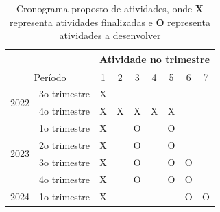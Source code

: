 \begin{table}[!h]
\centering
\label{table:cronogramaproposta}
\caption{Cronograma proposto de atividades, onde \textbf{X} representa atividades finalizadas e \textbf{O} representa atividades a desenvolver}
\label{tab:my-table}
\begin{tabular}{ccccccccc}
\cline{3-9}
 & \multicolumn{1}{c|}{} & \multicolumn{7}{c|}{Atividade no trimestre} \\ \hline
\multicolumn{2}{|c|}{Período} & \multicolumn{1}{c|}{1} & \multicolumn{1}{c|}{2} & \multicolumn{1}{c|}{3} & \multicolumn{1}{c|}{4} & \multicolumn{1}{c|}{5} & \multicolumn{1}{c|}{6} & \multicolumn{1}{c|}{7} \\ \hline
\multicolumn{1}{|c|}{\multirow{2}{*}{2022}} & \multicolumn{1}{c|}{3o trimestre} & \multicolumn{1}{c|}{X} & \multicolumn{1}{c|}{} & \multicolumn{1}{c|}{} & \multicolumn{1}{c|}{} & \multicolumn{1}{c|}{} & \multicolumn{1}{c|}{} & \multicolumn{1}{c|}{} \\ \cline{2-9} 
\multicolumn{1}{|c|}{} & \multicolumn{1}{c|}{4o trimestre} & \multicolumn{1}{c|}{X} & \multicolumn{1}{c|}{X} & \multicolumn{1}{c|}{X} & \multicolumn{1}{c|}{X} & \multicolumn{1}{c|}{X} & \multicolumn{1}{c|}{} & \multicolumn{1}{c|}{} \\ \hline
\multicolumn{1}{|c|}{\multirow{4}{*}{2023}} & \multicolumn{1}{c|}{1o trimestre} & \multicolumn{1}{c|}{X} & \multicolumn{1}{c|}{} & \multicolumn{1}{c|}{O} & \multicolumn{1}{c|}{} & \multicolumn{1}{c|}{O} & \multicolumn{1}{c|}{} & \multicolumn{1}{c|}{} \\ \cline{2-9} 
\multicolumn{1}{|c|}{} & \multicolumn{1}{c|}{2o trimestre} & \multicolumn{1}{c|}{X} & \multicolumn{1}{c|}{} & \multicolumn{1}{c|}{O} & \multicolumn{1}{c|}{} & \multicolumn{1}{c|}{O} & \multicolumn{1}{c|}{} & \multicolumn{1}{c|}{} \\ \cline{2-9} 
\multicolumn{1}{|c|}{} & \multicolumn{1}{c|}{3o trimestre} & \multicolumn{1}{c|}{X} & \multicolumn{1}{c|}{} & \multicolumn{1}{c|}{O} & \multicolumn{1}{c|}{} & \multicolumn{1}{c|}{O} & \multicolumn{1}{c|}{O} & \multicolumn{1}{c|}{} \\ \cline{2-9} 
\multicolumn{1}{|c|}{} & \multicolumn{1}{c|}{4o trimestre} & \multicolumn{1}{c|}{X} & \multicolumn{1}{c|}{} & \multicolumn{1}{c|}{O} & \multicolumn{1}{c|}{} & \multicolumn{1}{c|}{O} & \multicolumn{1}{c|}{O} & \multicolumn{1}{c|}{} \\ \hline
\multicolumn{1}{|c|}{\multirow{2}{*}{2024}} & \multicolumn{1}{c|}{1o trimestre} & \multicolumn{1}{c|}{X} & \multicolumn{1}{c|}{} & \multicolumn{1}{c|}{} & \multicolumn{1}{c|}{} & \multicolumn{1}{c|}{} & \multicolumn{1}{c|}{O} & \multicolumn{1}{c|}{O} \\ \cline{2-9} 

\end{tabular}
\end{table}
